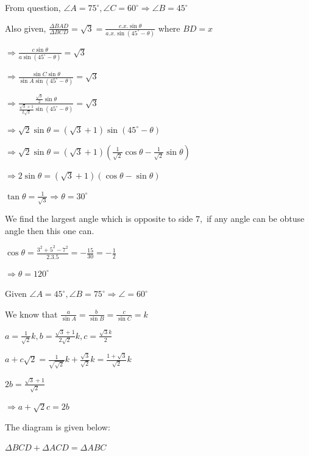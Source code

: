  \startplacefigure
    \externalfigure[18_1.pdf]
  \stopplacefigure

  From question, $\angle A = 75^\circ, \angle C = 60^\circ \Rightarrow \angle B = 45^\circ$

  Also given, $\frac{\Delta BAD}{\Delta BCD} = \sqrt{3} = \frac{c.x.\sin\theta}{a.x.\sin(45^\circ - \theta)}$ where
  $BD = x$

  $\Rightarrow \frac{c\sin\theta}{a\sin(45^\circ - \theta)} = \sqrt{3}$

  $\Rightarrow \frac{\sin C\sin\theta}{\sin A\sin(45^\circ - \theta)} = \sqrt{3}$

  $\Rightarrow \frac{\frac{\sqrt{3}}{2}\sin\theta}{\frac{\sqrt{3} + 1}{2\sqrt{2}}\sin(45^\circ - \theta)} = \sqrt{3}$

  $\Rightarrow \sqrt{2}\sin\theta = (\sqrt{3} + 1)\sin(45^\circ - \theta)$

  $\Rightarrow \sqrt{2}\sin\theta = (\sqrt{3} + 1)\left(\frac{1}{\sqrt{2}}\cos\theta - \frac{1}{\sqrt{2}}\sin\theta\right)$

  $\Rightarrow 2\sin\theta = (\sqrt{3} + 1)(\cos\theta - \sin\theta)$

  $\tan\theta = \frac{1}{\sqrt{3}} \Rightarrow \theta = 30^\circ$
\item We find the largest angle which is opposite to side $7,$ if any angle can be obtuse angle then this one can.

  $\cos \theta = \frac{3^2 + 5^2 - 7^2}{2.3.5} = -\frac{15}{30} = -\frac{1}{2}$

  $\Rightarrow \theta = 120^\circ$
\item Given $\angle A = 45^\circ, \angle B = 75^\circ \Rightarrow \angle = 60^\circ$

  We know that $\frac{a}{\sin A} = \frac{b}{\sin B} = \frac{c}{\sin C} = k$

  $a = \frac{1}{\sqrt{2}}k, b = \frac{\sqrt{3} + 1}{2\sqrt{2}}k, c = \frac{\sqrt{3}k}{2}$

  $a + c\sqrt{2} = \frac{1}{\sqrt{\sqrt{2}}}k + \frac{\sqrt{3}}{\sqrt{2}}k = \frac{1 + \sqrt{3}}{\sqrt{2}}k$

  $2b = \frac{\sqrt{3} + 1}{\sqrt{2}}$

  $\Rightarrow a + \sqrt{2}c = 2b$
\item The diagram is given below:

  \startplacefigure
    \externalfigure[18_2.pdf]
  \stopplacefigure

  $\Delta BCD + \Delta ACD = \Delta ABC$


